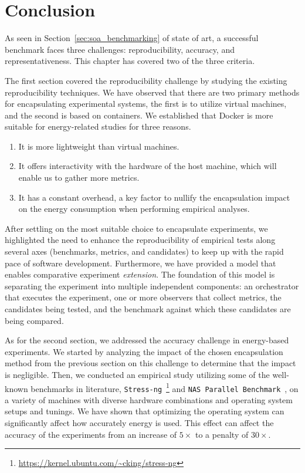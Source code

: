\section{Conclusion}
As seen in Section~\ref{sec:soa_benchmarking} of state of art, a successful benchmark faces three challenges: reproducibility, accuracy, and representativeness. 
This chapter has covered two of the three criteria.

The first section covered the reproducibility challenge by studying the existing reproducibility techniques. We have observed that there are two primary methods for encapsulating experimental systems, the first is to utilize virtual machines, and the second is based on containers. We established that Docker is more suitable for energy-related studies for three reasons.

\begin{enumerate}
    \item It is more lightweight than virtual machines.
    \item It offers interactivity with the hardware of the host machine, which will enable us to gather more metrics.
    \item It has a constant overhead, a key factor to nullify the encapsulation impact on the energy consumption when performing empirical analyses.
\end{enumerate}

After settling on the most suitable choice to encapsulate experiments, we highlighted the need to enhance the reproducibility of empirical tests along several axes (benchmarks, metrics, and candidates) to keep up with the rapid pace of software development. 
Furthermore, we have provided a model that enables comparative experiment \emph{extension}.
The foundation of this model is separating the experiment into multiple independent components: an orchestrator that executes the experiment, one or more observers that collect metrics, the candidates being tested, and the benchmark against which these candidates are being compared.

As for the second section, we addressed the accuracy challenge in energy-based experiments.
We started by analyzing the impact of the chosen encapsulation method from the previous section on this challenge to determine that the impact is negligible.
Then, we conducted an empirical study utilizing some of the well-known benchmarks in literature, \texttt{Stress-ng}~\footnote{\url{https://kernel.ubuntu.com/~cking/stress-ng}} and \texttt{NAS Parallel Benchmark}~\cite{Bailey:1991:NPB:125826.125925}, on a variety of machines with diverse hardware combinations and operating system setups and tunings. We have shown that optimizing the operating system can significantly affect how accurately energy is used. This effect can affect the accuracy of the experiments from an increase of $5\times$ to a penalty of $30\times$.

